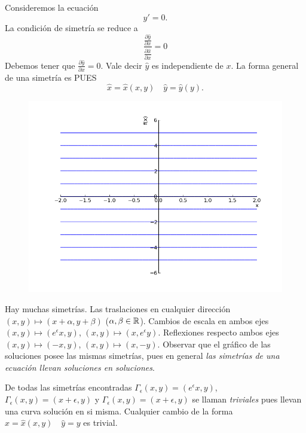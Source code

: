  \begin{ejemplo} Consideremos la ecuación
   \begin{equation}\label{eq:trivial}y'=0.
    \end{equation}
La condición de simetría se reduce a 
\[
\frac{\frac{\partial\hat{y}}{\partial x}}{\frac{\partial\hat{x}}{\partial x}}=0
\]
Debemos tener que $\frac{\partial\hat{y}}{\partial x}=0$. Vale decir $\hat{y}$ es independiente de $x$. La forma general de una simetría es PUES
\[\hat{x}=\hat{x}(x,y)\quad \hat{y}=\hat{y}(y).\]
\end{ejemplo}


\begin{figure}
   \includegraphics[scale=.3]{imagenes/sol_trivial.png}
 \end{figure}
 Hay muchas simetrías. Las traslaciones en cualquier dirección $(x,y)\mapsto (x+\alpha ,y+\beta)$ ($\alpha,\beta\in\mathbb{R}$). Cambios de escala en ambos ejes  $(x,y)\mapsto (e^{\epsilon}x,y)$, $(x,y)\mapsto (x,e^{\epsilon}y)$. Reflexiones respecto ambos ejes  $(x,y)\mapsto (-x,y)$, $(x,y)\mapsto (x,-y)$.  Observar que el gráfico de las soluciones posee las mismas simetrías, pues en general \emph{las simetrías de una ecuación llevan soluciones en soluciones}.

 De todas las simetrías encontradas $\Gamma_{\epsilon}(x,y)=(e^{\epsilon}x,y)$, $\Gamma_{\epsilon}(x,y)=(x+\epsilon,y)$ y  $\Gamma_{\epsilon}(x,y)=(x+\epsilon,y)$ se llaman \emph{triviales} pues llevan una curva solución en si misma.  Cualquier cambio de la forma $\hat{x}=\hat{x}(x,y)\quad \hat{y}=y$ es trivial.  


